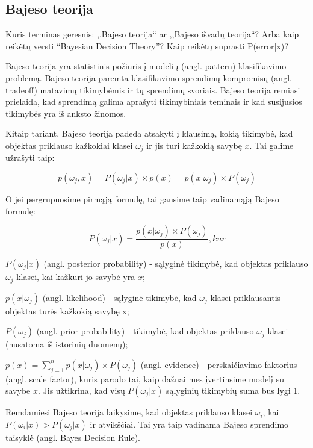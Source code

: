\subsection{Bajeso teorija}

Kuris terminas geresnis: ,,Bajeso teorija`` ar ,,Bajeso išvadų teorija``?
Arba kaip reikėtų versti ``Bayesian Decision Theory''?
Kaip reikėtų suprasti P(error|x)?

Bajeso teorija\cite{duda2001pattern} yra statistinis požiūris į modelių (angl.
pattern) klasifikavimo problemą. Bajeso teorija paremta klasifikavimo sprendimų kompromisų (angl.
tradeoff) matavimų tikimybėmis ir tų sprendimų svoriais. Bajeso teorija remiasi
prielaida, kad sprendimą galima aprašyti tikimybiniais teminais ir kad
susijusios tikimybės yra iš anksto žinomos.

Kitaip tariant, Bajeso teorija padeda atsakyti į klausimą, kokią tikimybė, kad
objektas priklauso kažkokiai klasei $\omega_j$ ir jis turi kažkokią savybę $x$.
Tai galime užrašyti taip: 

\begin{equation}
p(\omega_j, x) = P(\omega_j | x) \times p(x) = p(x|\omega_j) \times P(\omega_j)
\end{equation}

O jei pergrupuosime pirmąją formulę, tai gausime taip vadinamąją Bajeso formulę:

\begin{equation}
P(\omega_j | x) = \frac{p(x | \omega_j) \times P(\omega_j)}{p(x)}, kur
\end{equation}

$P(\omega_j | x)$ (angl. posterior probability) - sąlyginė tikimybė,
kad objektas priklauso $\omega_j$ klasei, kai kažkuri jo savybė yra $x$;

$p(x | \omega_j)$ (angl. likelihood) - sąlyginė tikimybė, kad $\omega_j$ klasei
priklausantis objektas turės kažkokią savybę x;

$P(\omega_j)$ (angl. prior probability) - tikimybė, kad objektas priklauso
$\omega_j$ klasei (nusatoma iš istorinių duomenų);

$p(x) = \sum_{j=1}^{n} p(x | \omega_j) \times P(\omega_j)$ (angl. evidence) -
perskaičiavimo faktorius (angl. scale factor), kuris parodo tai, kaip dažnai mes
įvertinsime modelį su savybe $x$. Jis užtikrina, kad visų $P(\omega_j | x)$
sąlyginių tikimybių suma bus lygi 1.

Remdamiesi Bajeso teorija laikysime, kad objektas priklauso klasei $\omega_i$,
kai $P(\omega_i | x) > P(\omega_j | x)$ ir atvikščiai. Tai yra taip vadinama
Bajeso sprendimo taisyklė (angl. Bayes Decision Rule).
